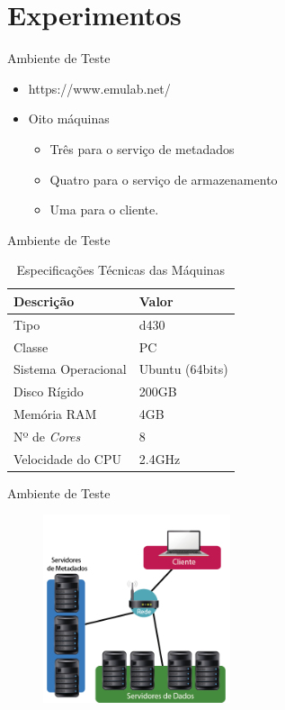 \section{Experimentos}

\begin{frame}{Ambiente de Teste}
	\begin{itemize}
		\item https://www.emulab.net/
		\item Oito máquinas
		\begin{itemize}
			\item Três para o serviço de metadados
			\item Quatro para o serviço de armazenamento
			\item Uma para o cliente.
		\end{itemize}
	\end{itemize}
\end{frame}

\begin{frame}{Ambiente de Teste}
		\begin{table} [htb]
			\caption{Especificações Técnicas das Máquinas}
			\centering
			\begin{tabular}{|l|l|} \hline
				\textbf{Descrição} 	& \textbf{Valor} \\ \hline
				
				Tipo				& d430\\ \hline
				Classe				& PC\\ \hline
				Sistema Operacional & Ubuntu (64bits)\\ \hline
				Disco Rígido		& 200GB \\ \hline
				Memória RAM			& 4GB \\ \hline
				Nº de \textit{Cores}& 8 \\ \hline
				Velocidade do CPU	& 2.4GHz  \\ \hline
				
			\end{tabular}
			\label{tab:exp_vm}
		\end{table}
\end{frame}

\begin{frame}{Ambiente de Teste}
		\begin{figure}
			\includegraphics[width=5.5cm]{imagens/emulab}
			\label{fig:emulab}
		\end{figure}
	
\end{frame}

